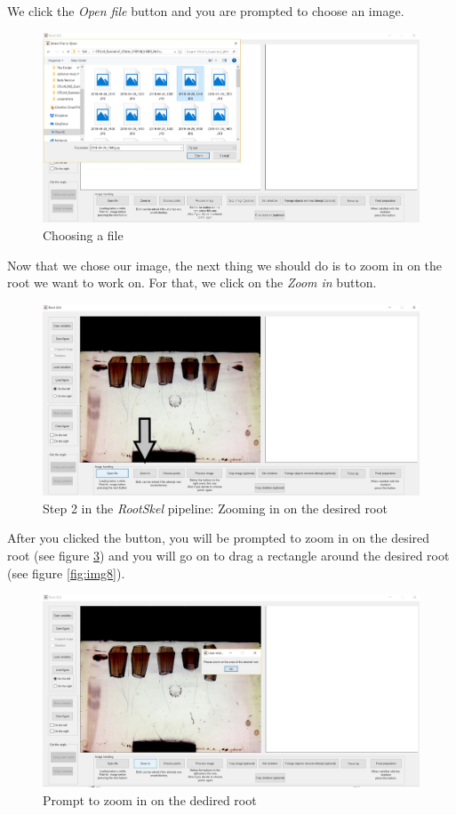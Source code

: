  We click the \textit{Open file} button and you are prompted to choose an image.
 \begin{figure}[H]
 	\centering
 	\includegraphics[width=\textwidth]{../Figures/manual/step2.jpg}
 	\caption{Choosing a file}
 	\label{fig:img5}
 \end{figure}
 
 Now that we chose our image, the next thing we should do is to zoom in on the root we want to work on. 
 For that, we click on the \textit{Zoom in} button.
 \begin{figure}[H]
 	\centering
 	\includegraphics[width=\textwidth]{../Figures/manual/step3.jpg}
 	\caption{Step 2 in the \textit{RootSkel} pipeline: Zooming in on the desired root}
 	\label{fig:img6}
 \end{figure}
 
 After you clicked the button, you will be prompted to zoom in on the desired root (see figure \ref{fig:img7})
 and you will go on to drag a rectangle around the desired root (see figure \ref{fig:img8}).
 	
\begin{figure}[H]
 	\centering
 	\includegraphics[width=\textwidth]{../Figures/manual/step4.jpg}
 	\caption{Prompt to zoom in on the dedired root}
 	\label{fig:img7}
\end{figure} 	
 
